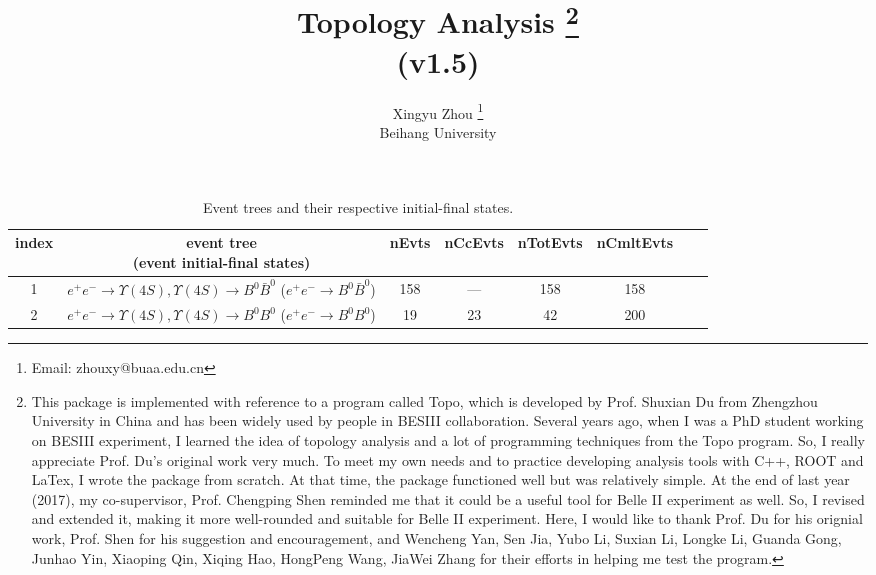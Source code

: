 \documentclass[landscape]{article}
\begin{document}
\title{Topology Analysis \footnote{\normalsize{This package is implemented with reference to a program called {\sc Topo}, which is developed by Prof. Shuxian Du from Zhengzhou University in China and has been widely used by people in BESIII collaboration. Several years ago, when I was a PhD student working on BESIII experiment, I learned the idea of topology analysis and a lot of programming techniques from the {\sc Topo} program. So, I really appreciate Prof. Du's original work very much. To meet my own needs and to practice developing analysis tools with C++, ROOT and LaTex, I wrote the package from scratch. At that time, the package functioned well but was relatively simple. At the end of last year (2017), my co-supervisor, Prof. Chengping Shen reminded me that it could be a useful tool for Belle II experiment as well. So, I revised and extended it, making it more well-rounded and suitable for Belle II experiment. Here, I would like to thank Prof. Du for his orignial work, Prof. Shen for his suggestion and encouragement, and Wencheng Yan, Sen Jia, Yubo Li, Suxian Li, Longke Li, Guanda Gong, Junhao Yin, Xiaoping Qin, Xiqing Hao, HongPeng Wang, JiaWei Zhang for their efforts in helping me test the program.}} \\ \vspace{0.1cm} \Large{(v1.5)}}
\author{Xingyu Zhou \footnote{\normalsize{Email: zhouxy@buaa.edu.cn}} \\ \vspace{0.1cm} Beihang University}
\maketitle

\clearpage


\listoftables


\clearpage

\begin{table}[htbp!]
\caption{Event trees and their respective initial-final states.}
\small
\centering
\begin{tabular}{|c|c|c|c|c|c|c|c|}
\hline
index & \thead{event tree \\ (event initial-final states)} & nEvts & nCcEvts & nTotEvts & nCmltEvts \\
\hline
1 & \makecell{ $ 
e^{+} e^{-} \rightarrow \Upsilon(4S) ,
\Upsilon(4S) \rightarrow B^{0} \bar{B}^{0} 
$ \\ ($
e^{+} e^{-} \rightarrow B^{0} \bar{B}^{0} 
$) } & 158 & --- & 158 & 158 \\
\hline
2 & \makecell{ $ 
e^{+} e^{-} \rightarrow \Upsilon(4S) ,
\Upsilon(4S) \rightarrow B^{0} B^{0} 
$ \\ ($
e^{+} e^{-} \rightarrow B^{0} B^{0} 
$) } & 19 & 23 & 42 & 200 \\
\hline
\end{tabular}
\end{table}
\end{document}
